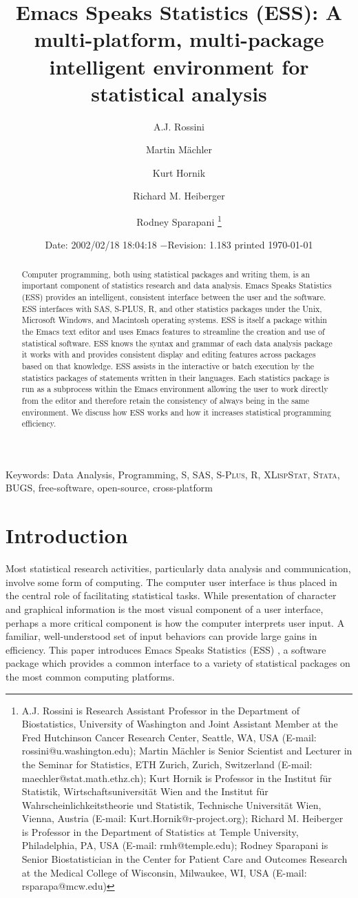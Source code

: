 \documentclass{article}
\title{Emacs Speaks Statistics (ESS): A multi-platform, multi-package
intelligent environment for statistical analysis}
\author{A.J. Rossini \and Martin M{\"a}chler \and Kurt Hornik \and Richard
  M. Heiberger \and Rodney Sparapani \footnote{%
    A.J. Rossini is Research Assistant Professor in the Department of
    Biostatistics, University of Washington and Joint Assistant Member at
    the Fred Hutchinson Cancer Research Center, Seattle, WA, USA
    (E-mail: rossini@u.washington.edu);
    Martin M{\"a}chler is Senior Scientist and Lecturer in the Seminar for
    Statistics, ETH Zurich, Zurich, Switzerland
    (E-mail: maechler@stat.math.ethz.ch);
    Kurt Hornik is Professor in the Institut f{\"u}r Statistik,
    Wirtschaftsuniversit{\"a}t Wien and the Institut f{\"u}r
    Wahrscheinlichkeitstheorie und Statistik, Technische Universit{\"a}t
    Wien, Vienna, Austria (E-mail: Kurt.Hornik@r-project.org);
    Richard M. Heiberger is Professor in the Department of Statistics at
    Temple University, Philadelphia, PA, USA (E-mail: rmh@temple.edu);
    Rodney Sparapani is Senior Biostatistician in the Center for Patient
    Care and Outcomes Research at the Medical College of Wisconsin, 
    Milwaukee, WI, USA (E-mail: rsparapa@mcw.edu)}}
\date{$ $Date: 2002/02/18 18:04:18 $ - $Revision: 1.183 $ $\tiny printed \today}
\newif\ifdraft
\renewcommand{\baselinestretch}{1.5}
\newcommand*{\SAS}{\textsc{SAS}}
\newcommand*{\Splus}{\textsc{S-Plus}}
\newcommand*{\XLispStat}{\textsc{XLispStat}}
\newcommand*{\Stata}{\textsc{Stata}}
\begin{document}

\ifdraft
\setcounter{page}{0}
\tableofcontents
\fi

\maketitle

\ifdraft{}%
\else%
 \renewcommand{\baselinestretch}{1.5}
\fi

\begin{abstract}
  Computer programming, both using statistical packages and writing
  them, is an important component of statistics research and data
  analysis.  Emacs Speaks Statistics (ESS) provides an intelligent,
  consistent interface between the user and the software.  ESS
  interfaces with SAS, S-PLUS, R, and other statistics packages under
  the Unix, Microsoft Windows, and Macintosh operating systems.  ESS
  is itself a package within the Emacs text editor and uses Emacs
  features to streamline the creation and use of statistical software.
  ESS knows the syntax and grammar of each data analysis package it
  works with and provides consistent display and editing features
  across packages based on that knowledge.  ESS assists in the
  interactive or batch execution by the statistics packages of
  statements written in their languages.  Each statistics package is
  run as a subprocess within the Emacs environment allowing the user
  to work directly from the editor and therefore retain the
  consistency of always being in the same environment.  We discuss how
  ESS works and how it increases statistical programming efficiency.
\end{abstract}

\noindent Keywords: Data Analysis, Programming, 
S, \SAS, \Splus, R, \XLispStat, \Stata, BUGS, free-software,
open-source, cross-platform

\section{Introduction}
\label{sec:introduction}

Most statistical research activities, particularly data analysis and
communication, involve some form of computing.  The computer user
interface is thus placed in the central role of facilitating
statistical tasks.  While presentation of character and graphical
information is the most visual component of a user interface,
perhaps a more critical component is how the computer interprets user
input.  A familiar, well-understood set of input behaviors can provide
large gains in efficiency.  This paper introduces Emacs Speaks
Statistics (ESS) \citep{ESS}, a software package which provides a
common interface to a variety of statistical packages on the most
common computing platforms.
\end{document}
